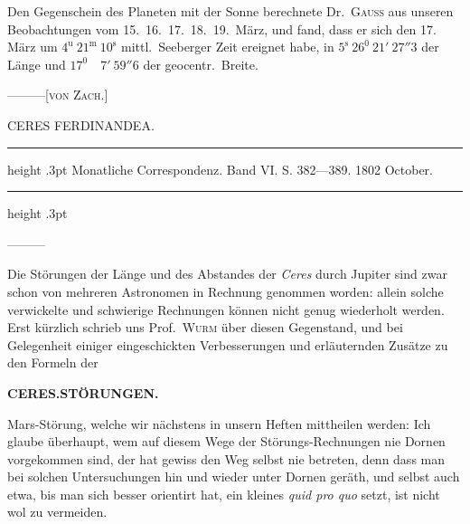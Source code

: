 Den Gegenschein des Planeten mit der Sonne berechnete Dr.\ \textsc{Gauss} aus unseren Beobachtungen vom 15.\ 16.\ 17.\ 18.\ 19.\ März, und fand, dass er sich den 17. März um $4^{\mathrm{u}}\ 21^{\mathrm{m}}\ 10^{\mathrm{s}}$ mittl.\ Seeberger Zeit ereignet habe, in $5^{\mathrm{s}}\ 26^0\ 21'\ 27''3$ der Länge und $17^0\quad7'\ 59''6$ der geocentr.\ Breite.
\par\noindent —\quad —\quad —\hfill [\textsc{von Zach}.]\par

\par\medskip
{}
\begin{center}\large CERES FERDINANDEA.\end{center}
\begin{center}\parbox{.86\linewidth}{\centering\footnotesize\frenchspacing
\hrule height .3pt\relax\vspace{2.5pt}
Monatliche Correspondenz. Band VI. S. 382—389. 1802 October.\par
\vspace{2.5pt}\hrule height .3pt\relax
}\end{center}
\par\indent ---\enspace---\enspace---\par\nobreak

Die Störungen der Länge und des Abstandes der \textit{Ceres} durch Jupiter sind zwar schon von mehreren Astronomen in Rechnung genommen worden: allein solche verwickelte und schwierige Rechnungen können nicht genug wiederholt werden. Erst kürzlich schrieb uns Prof.\ \textsc{Wurm} über diesen Gegenstand, und bei Gelegenheit einiger eingeschickten Verbesserungen und erläuternden Zusätze zu den Formeln der
\newcommand{\JupiterSymbol}{\text{\mdseries\AstroSymbols ♃}}
\global\let\JupiterSymbol\JupiterSymbol
\clearpage
\thispagestyle{empty}
\noindent{}%
\makebox[12mm][l]{}%
\parbox[t]{\dimexpr\linewidth-24mm\relax}{\centering\footnotesize\bfseries CERES.\quad STÖRUNGEN.\par}%
\par\nobreak\medskip
\noindent Mars-Störung, welche wir nächstens in unsern Heften mittheilen werden: Ich glaube überhaupt, wem auf diesem Wege der Störungs-Rechnungen nie Dornen vorgekommen sind, der hat gewiss den Weg selbst nie betreten, denn dass man bei solchen Untersuchungen hin und wieder unter Dornen geräth, und selbst auch etwa, bis man sich besser orientirt hat, ein kleines \textit{quid pro quo} setzt, ist nicht wol zu vermeiden.

